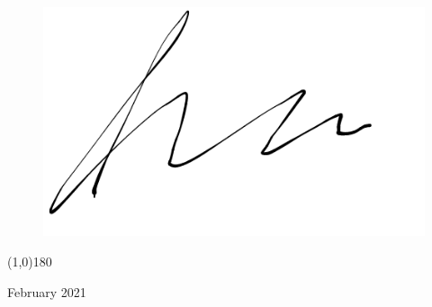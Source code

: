 \begin{figure}[h]
	\centering
	\includegraphics[scale=.20]{includes/sig.png}
\end{figure}
\begin{center}
\vspace*{-1.7cm}
\line(1,0){180}
\smallskip

\thesisWriter{}

February 2021
\end{center}

\newpage

